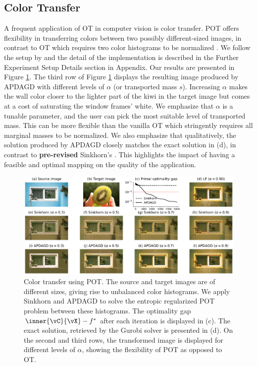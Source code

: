 \subsection{Color Transfer}
A frequent application of OT in computer vision is color transfer. POT offers flexibility in transferring colors between two possibly different-sized images, in contrast to OT which requires two color histograms to be normalized \citep{bonneel2015sliced}. We follow the setup by \citep{Blondel-2018-Smooth} and the detail of the implementation is described in the Further Experiment Setup Details section in Appendix. Our results are presented in Figure \ref{fig:color_transfer_comparison}. The third row of Figure \ref{fig:color_transfer_comparison} displays the resulting image produced by APDAGD with different levels of $\alpha$ (or transported mass $s$). Increasing $\alpha$ makes the wall color closer to the lighter part of the kiwi in the target image but comes at a cost of saturating the window frames' white. We emphasize that $\alpha$ is a tunable parameter, and the user can pick the most suitable level of transported mass. This can be more flexible than the vanilla OT which stringently requires all marginal masses to be normalized. We also emphasize that qualitatively, the solution produced by APDAGD closely matches the exact solution in (d), in contrast to \textbf{pre-revised} Sinkhorn's \cite{nhatho-mmpot}. This highlights the impact of having a feasible and optimal mapping on the quality of the application. 

\begin{figure}
    \centering
  \includegraphics[width=1\linewidth]{figs/color_transfer_all.png}
  \caption{Color transfer using POT. The source and target images are of different sizes, giving rise to unbalanced color histograms. We apply Sinkhorn and APDAGD to solve the entropic regularized POT problem between these histograms. The optimality gap $\inner{\vC}{\vX} - f^*$ after each iteration is displayed in (c). The exact solution, retrieved by the Gurobi solver is presented in (d). On the second and third rows, the transformed image is displayed for different levels of $\alpha$, showing the flexibility of POT as opposed to OT.}  
  \label{fig:color_transfer_comparison}
\end{figure}
